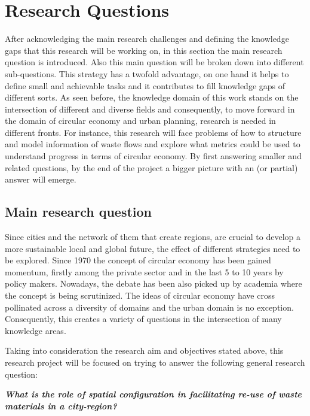 \chapter{Research Questions}
After acknowledging the main research challenges and defining the knowledge gaps that this research will be working on, in this section the main research question is introduced. Also this main question will be broken down into different sub-questions. This strategy has a twofold advantage, on one hand it helps to define small and achievable tasks and it contributes to fill knowledge gaps of different sorts. As seen before, the knowledge domain of this work stands on the intersection of different and diverse fields and consequently, to move forward in the domain of circular economy and urban planning, research is needed in different fronts. For instance, this research will face problems of how to structure and model information of waste flows and explore what metrics could be used to understand progress in terms of circular economy. By first answering smaller and related questions, by the end of the project a bigger picture with an (or partial) answer will emerge. 

\section{Main research question}
Since cities and the network of them that create regions, are crucial to develop a more sustainable local and global future, the effect of different strategies need to be explored. Since 1970 the concept of circular economy has been gained momentum, firstly among the private sector and in the last 5 to 10 years by policy makers. Nowadays, the debate has been also picked up by academia where the concept is being scrutinized. The ideas of circular economy have cross pollinated across a diversity of domains and the urban domain is no exception. Consequently, this creates a variety of questions in the intersection of many knowledge areas. \par
Taking into consideration the research aim and objectives stated above, this research project will be focused on trying to answer the following general research question: \par 

\textbf{\textit{What is the role of spatial configuration in facilitating re-use of waste materials in a city-region?}} %



